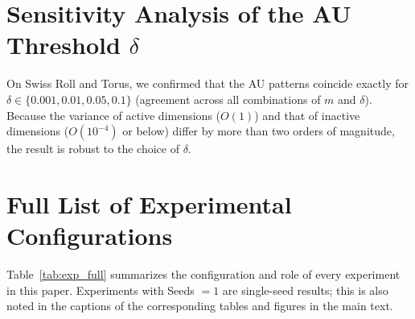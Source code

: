\documentclass[make,article,submit,pdftex,moreauthors]{Definitions/mdpi}
\begin{document}
\section[\appendixname~\thesection]{Sensitivity Analysis of the AU Threshold $\delta$}\label{app:delta}

On Swiss Roll and Torus, we confirmed that the AU patterns coincide exactly for
$\delta \in \{0.001, 0.01, 0.05, 0.1\}$ (agreement across all combinations of $m$ and $\delta$).
Because the variance of active dimensions ($O(1)$) and that of inactive dimensions ($O(10^{-4})$ or below)
differ by more than two orders of magnitude, the result is robust to the choice of $\delta$.

\section[\appendixname~\thesection]{Full List of Experimental Configurations}\label{app:exp_table}

Table~\ref{tab:exp_full} summarizes the configuration and role of every experiment in
this paper.
Experiments with Seeds $=1$ are single-seed results; this is also noted in the captions
of the corresponding tables and figures in the main text.
\end{document}
